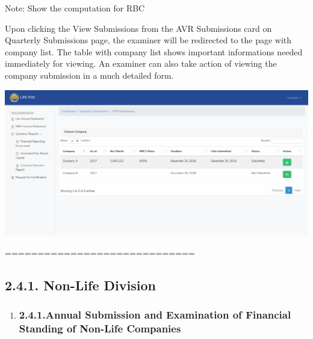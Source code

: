 \documentclass{article}
\begin{document}
Note: Show the computation for RBC%

Upon clicking the View Submissions from the AVR
Submissions card on Quarterly Submissions page, the examiner will be
redirected to the page with company list. The table with company list
shows important informations needed immediately for viewing. An examiner
can also take action of viewing the company submission in a much
detailed form.%

\includegraphics[keepaspectratio=true]{up-ic-screens/image177}{}%

\mdhr{}%

\noindent{}=============================%

\subsection{2.4.\hspace*{0.5em}1.  Non-Life Division}\label{sec-1-non-life-division}%

\begin{enumerate}[noitemsep,topsep=\mdcompacttopsep]%

\item{}
\subsubsection{2.4.1.\hspace*{0.5em}Annual Submission and Examination of Financial Standing of Non-Life Companies}\label{sec-annual-submission-and-examination-of-financial-standing-of-non-life-companies}%
\end{enumerate}%
\end{document}
